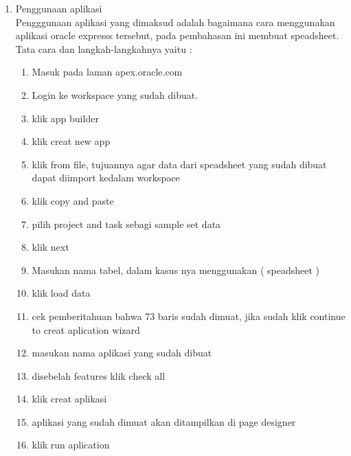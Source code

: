 \begin{enumerate}
\item Penggunaan aplikasi \\
Pengggunaan aplikasi yang dimaksud adalah bagaimana cara menggunakan aplikasi oracle expresss tersebut, pada pembahasan ini  membuat speadsheet. Tata cara dan langkah-langkahnya yaitu :
\begin{enumerate}
\item Masuk pada laman apex.oracle.com
\item Login ke workspace yang sudah dibuat.
\item klik app builder
\item klik creat new app
\item klik from file, tujuannya agar data dari speadsheet yang sudah dibuat dapat diimport kedalam workspace
\item klik copy and paste
\item pilih project and task sebagi sample set data
\item klik next
\item Masukan nama tabel, dalam kasus nya menggunakan ( speadsheet ) 
\item klik load data
\item cek pemberitahuan bahwa 73 baris sudah dimuat, jika sudah klik continue to creat aplication wizard
\item masukan nama aplikasi yang sudah dibuat
\item disebelah features klik check all
\item klik creat aplikasi
\item aplikasi yang sudah dimuat akan ditampilkan di page designer
\item klik run aplication
 
\end{enumerate}

\end{enumerate}
